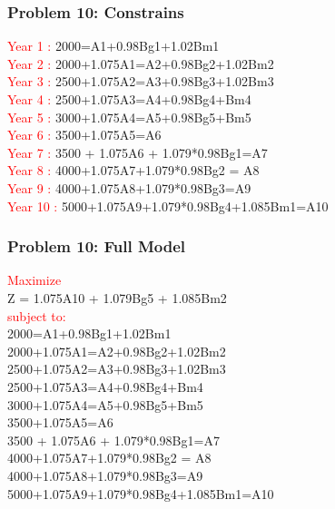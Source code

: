 \documentclass[10pt,svgnames,fragile]{beamer}
\begin{document}
\begin{frame}[label={sec:orge9abdcb}]{}
\frametitle{Problem 10: Constrains }
\textcolor{red}{Year 1 :} 2000=A1+0.98Bg1+1.02Bm1\\

\textcolor{red}{Year 2 :} 2000+1.075A1=A2+0.98Bg2+1.02Bm2\\

\textcolor{red}{Year 3 :} 2500+1.075A2=A3+0.98Bg3+1.02Bm3\\

\textcolor{red}{Year 4 :} 2500+1.075A3=A4+0.98Bg4+Bm4\\

\textcolor{red}{Year 5 :} 3000+1.075A4=A5+0.98Bg5+Bm5\\

\textcolor{red}{Year 6 :} 3500+1.075A5=A6\\

\textcolor{red}{Year 7 :} 3500 + 1.075A6 + 1.079*0.98Bg1=A7\\

\textcolor{red}{Year 8 :} 4000+1.075A7+1.079*0.98Bg2 = A8\\

\textcolor{red}{Year 9 :} 4000+1.075A8+1.079*0.98Bg3=A9\\

\textcolor{red}{Year 10 :} 5000+1.075A9+1.079*0.98Bg4+1.085Bm1=A10

\end{frame}

\begin{frame}[label={sec:orge9abdcb}]{}
\frametitle{Problem 10: Full Model }
\textcolor{red}{Maximize}\\[1em]
Z =  1.075A10 + 1.079Bg5 + 1.085Bm2\\[1em]
\textcolor{red}{subject to:}\\[1em]
2000=A1+0.98Bg1+1.02Bm1\\

2000+1.075A1=A2+0.98Bg2+1.02Bm2\\

2500+1.075A2=A3+0.98Bg3+1.02Bm3\\

2500+1.075A3=A4+0.98Bg4+Bm4\\

3000+1.075A4=A5+0.98Bg5+Bm5\\

3500+1.075A5=A6\\

3500 + 1.075A6 + 1.079*0.98Bg1=A7\\

4000+1.075A7+1.079*0.98Bg2 = A8\\

4000+1.075A8+1.079*0.98Bg3=A9\\

5000+1.075A9+1.079*0.98Bg4+1.085Bm1=A10
\end{frame}
\end{document}
